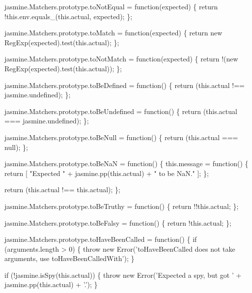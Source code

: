 \begin{DoxyCodeInclude}
jasmine.Matchers.prototype.toNotEqual = \textcolor{keyword}{function}(expected) \{
  \textcolor{keywordflow}{return} !this.env.equals\_(this.actual, expected);
\};

jasmine.Matchers.prototype.toMatch = \textcolor{keyword}{function}(expected) \{
  \textcolor{keywordflow}{return} \textcolor{keyword}{new} RegExp(expected).test(this.actual);
\};

jasmine.Matchers.prototype.toNotMatch = \textcolor{keyword}{function}(expected) \{
  \textcolor{keywordflow}{return} !(\textcolor{keyword}{new} RegExp(expected).test(this.actual));
\};

jasmine.Matchers.prototype.toBeDefined = \textcolor{keyword}{function}() \{
  \textcolor{keywordflow}{return} (this.actual !== jasmine.undefined);
\};

jasmine.Matchers.prototype.toBeUndefined = \textcolor{keyword}{function}() \{
  \textcolor{keywordflow}{return} (this.actual === jasmine.undefined);
\};

jasmine.Matchers.prototype.toBeNull = \textcolor{keyword}{function}() \{
  \textcolor{keywordflow}{return} (this.actual === null);
\};

jasmine.Matchers.prototype.toBeNaN = \textcolor{keyword}{function}() \{
    this.message = \textcolor{keyword}{function}() \{
        \textcolor{keywordflow}{return} [ \textcolor{stringliteral}{"Expected "} + jasmine.pp(this.actual) + \textcolor{stringliteral}{" to be NaN."} ];
    \};

    \textcolor{keywordflow}{return} (this.actual !== this.actual);
\};

jasmine.Matchers.prototype.toBeTruthy = \textcolor{keyword}{function}() \{
  \textcolor{keywordflow}{return} !!this.actual;
\};


jasmine.Matchers.prototype.toBeFalsy = \textcolor{keyword}{function}() \{
  \textcolor{keywordflow}{return} !this.actual;
\};


jasmine.Matchers.prototype.toHaveBeenCalled = \textcolor{keyword}{function}() \{
  \textcolor{keywordflow}{if} (arguments.length > 0) \{
    \textcolor{keywordflow}{throw} \textcolor{keyword}{new} Error(\textcolor{stringliteral}{'toHaveBeenCalled does not take arguments, use toHaveBeenCalledWith'});
  \}

  \textcolor{keywordflow}{if} (!jasmine.isSpy(\textcolor{keyword}{this}.actual)) \{
    \textcolor{keywordflow}{throw} \textcolor{keyword}{new} Error(\textcolor{stringliteral}{'Expected a spy, but got '} + jasmine.pp(\textcolor{keyword}{this}.actual) + \textcolor{charliteral}{'.'});
  \}


\end{DoxyCodeInclude}
